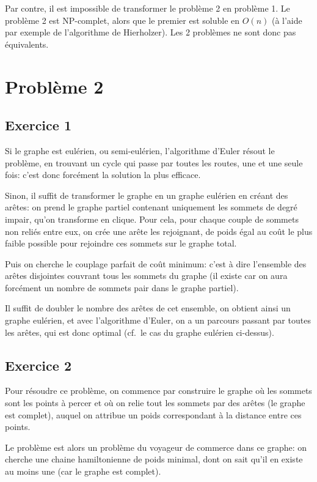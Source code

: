 \documentclass[draft]{scrartcl}
\begin{document}
    Par contre, il est impossible de transformer le problème 2 en problème 1.
    Le problème 2 est NP-complet, alors que le premier est soluble en $O(n)$ (à
    l'aide par exemple de l'algorithme de Hierholzer). Les 2 problèmes ne sont
    donc pas équivalents.


\section{Problème 2}
  \subsection{Exercice 1}
    Si le graphe est eulérien, ou semi-eulérien, l'algorithme d'Euler résout le
    problème, en trouvant un cycle qui passe par toutes les routes, une et une
    seule fois: c'est donc forcément la solution la plus efficace.

    Sinon, il suffit de transformer le graphe en un graphe eulérien en créant
    des arêtes: on prend le graphe partiel contenant uniquement les sommets de
    degré impair, qu'on transforme en clique. Pour cela, pour chaque couple de
    sommets non reliés entre eux, on crée une arête les rejoignant, de poids
    égal au coût le plus faible possible pour rejoindre ces sommets sur le
    graphe total.

    Puis on cherche le couplage parfait de coût minimum: c'est à dire
    l'ensemble des arêtes disjointes couvrant tous les sommets du graphe (il
    existe car on aura forcément un nombre de sommets pair dans le graphe
    partiel).

    Il suffit de doubler le nombre des arêtes de cet ensemble, on obtient ainsi
    un graphe eulérien, et avec l'algorithme d'Euler, on a un parcours passant
    par toutes les arêtes, qui est donc optimal (cf.\ le cas du graphe eulérien
    ci-dessus).

  \subsection{Exercice 2}
    Pour résoudre ce problème, on commence par construire le graphe où les
    sommets sont les points à percer et où on relie tout les sommets par des
    arêtes (le graphe est complet), auquel on attribue un poids correspondant à
    la distance entre ces points.
    
    Le problème est alors un problème du voyageur de commerce dans ce graphe:
    on cherche une chaine hamiltonienne de poids minimal, dont on sait qu'il en
    existe au moins une (car le graphe est complet).
    
\end{document}

